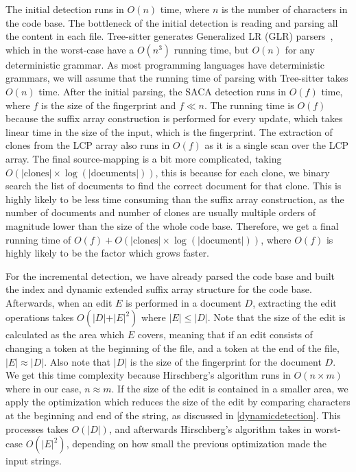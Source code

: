 The initial detection runs in $O(n)$ time, where $n$ is the number of characters in the
code base. The bottleneck of the initial detection is reading and parsing all the content
in each file. Tree-sitter generates Generalized LR (GLR) parsers~\cite{GLR}, which in the
worst-case have a $O(n^3)$ running time, but $O(n)$ for any deterministic grammar. As most
programming languages have deterministic grammars, we will assume that the running time of
parsing with Tree-sitter takes $O(n)$ time. After the initial parsing, the SACA detection
runs in $O(f)$ time, where $f$ is the size of the fingerprint and $f \ll n$. The running
time is $O(f)$ because the suffix array construction is performed for every update, which
takes linear time in the size of the input, which is the fingerprint. The extraction of
clones from the LCP array also runs in $O(f)$ as it is a single scan over the LCP array.
The final source-mapping is a bit more complicated, taking $O(\vert\text{clones}\vert
\times \log (\vert\text{documents}\vert))$, this is because for each clone, we binary
search the list of documents to find the correct document for that clone. This is highly
likely to be less time consuming than the suffix array construction, as the number of
documents and number of clones are usually multiple orders of magnitude lower than the
size of the whole code base. Therefore, we get a final running time of $O(f) +
O(\vert\text{clones}\vert \times \log(\vert\text{document}\vert))$, where $O(f)$ is highly
likely to be the factor which grows faster.

For the incremental detection, we have already parsed the code base and built the index
and dynamic extended suffix array structure for the code base. Afterwards, when an edit
$E$ is performed in a document $D$, extracting the edit operations takes $O(\vert D\vert +
\vert E\vert^2)$ where $\vert E\vert \leq \vert D\vert$. Note that the size of the edit is
calculated as the area which $E$ covers, meaning that if an edit consists of changing a
token at the beginning of the file, and a token at the end of the file, $\vert E\vert
\approx \vert D\vert$. Also note that $\vert D\vert$ is the size of the fingerprint for
the document $D$. We get this time complexity because Hirschberg's algorithm runs in $O(n
\times m)$ where in our case, $n \approx m$. If the size of the edit is contained in a
smaller area, we apply the optimization which reduces the size of the edit by comparing
characters at the beginning and end of the string, as discussed in
\cref{dynamicdetection}. This processes takes $O(\vert D\vert)$, and afterwards
Hirschberg's algorithm takes in worst-case $O(\vert E\vert^2)$, depending on how small the
previous optimization made the input strings.


